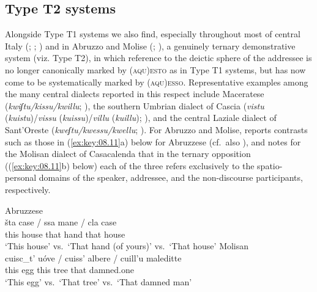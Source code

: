 \documentclass[output=paper]{langsci/langscibook}
\begin{document}
\subsection{Type T2 systems}

Alongside Type T1 systems we also find, especially throughout most of central
Italy (\citealt[616]{Vignuzzi:1988a}; \citealt[315]{Vignuzzi:1997a};
\citealt[129]{Loporcaro:2009a}) and in Abruzzo and Molise
(\citealt[647]{Marinucci:1988a}; \citealt[161f]{Stavinschi:2009a}), a
genuinely ternary demonstrative system (viz. Type T2), in which reference to
the deictic sphere of the addressee is no longer canonically marked by
\textsc{(aqu)esto} as in Type T1 systems, but has now come to be systematically
marked by \textsc{(aqu)esso}. Representative examples among the many central
dialects reported in this respect include Maceratese
(\emph{kwiʃtu/kissu/kwillu}; \citealt[232]{Regnicoli:1995a}), the southern
Umbrian dialect of Cascia (\emph{vistu} (\emph{kuistu})/\emph{vissu}
(\emph{kuissu})/\emph{villu} (\emph{kuillu}); \citealt[123]{Moretti:1987a}),
and the central Laziale dialect of Sant’Oreste (\emph{kweʃtu/kwessu/kwellu};
\citealt[74]{Cimarra:1998a}). For Abruzzo and Molise,
\citet[22]{Finamore:1893a} reports contrasts such as those in
(\ref{ex:key:08.11}a) below for Abruzzese (cf.\ also
\citealt[47]{Verratti:1968a}), and \citet[75]{Vincelli:1995a} notes for the
Molisan dialect of Casacalenda that in the ternary opposition
((\ref{ex:key:08.11}b) below) each of the three  refers
exclusively to the spatio-personal domains of the speaker, addressee, and the
non-discourse participants, respectively.

\ea \label{bkm:Ref370498873}\label{ex:key:08.11}
    \ea Abruzzese \citep{Finamore:1893a}\\
    \gll šta  case  \textup{\quad /\quad}  ssa  mane  \textup{\quad /\quad} cla  case\\
            this  house  {}  that  hand  {}  that  house\\
        \glt \enquote*{This house} vs.\ \enquote*{That hand (of yours)} vs.\ \enquote*{That house}
    \ex Molisan \citep{Vincelli:1995a}\\
    \gll cuisc\_t’  uóve  \textup{\quad /\quad}  cuiss’  albere  \textup{\quad /\quad}  cuill’u  maleditte\\
            this  egg {} this  tree {} that  damned.one\\
    \glt    \enquote*{This egg} vs.\ \enquote*{That tree} vs.\ \enquote*{That
            damned man}
    \z
\z
\end{document}
